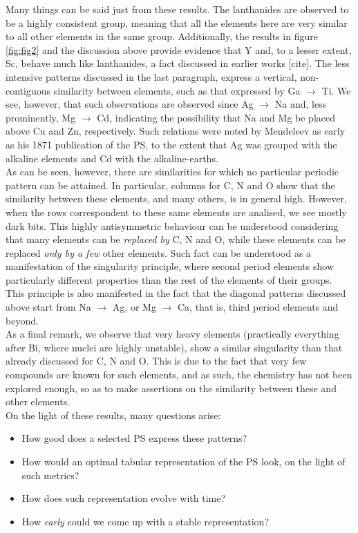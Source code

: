 \documentclass[article]{article}
\begin{document}
Many things can be said just from these results. The lanthanides are observed to be a highly consistent group, meaning that all the elements here are very similar to all other elements in the same group. Additionally, the results in figure \ref{fig:fig2} and the discussion above provide evidence that Y and, to a lesser extent, Sc, behave much like lanthanides, a fact discussed in earlier works [cite]. The less intensive patterns discussed in the last paragraph, express a vertical, non-contiguous similarity between elements, such as that expressed by Ga $\rightarrow$ Ti. We see, however, that such observations are observed since Ag $\rightarrow$ Na and, less prominently, Mg $\rightarrow$ Cd, indicating the possibility that Na and Mg be placed above Cu and Zn, respectively. Such relations were noted by Mendeleev as early as his 1871 publication of the PS, to the extent that Ag was grouped with the alkaline elements and Cd with the alkaline-earths.\\

As can be seen, however, there are similarities for which no particular periodic pattern can be attained. In particular, columns for C, N and O show that the similarity between these elements, and many others, is in general high. However, when the rows correspondent to these same elements are analised, we see mostly dark bits. This highly antisymmetric behaviour can be understood considering that many elements can be \textit{replaced by} C, N and O, while these elements can be replaced \textit{only by a few} other elements. Such fact can be understood as a manifestation of the singularity principle, where second period elements show particularly different properties than the rest of the elements of their groups. This principle is also manifested in the fact that the diagonal patterns discussed above start from Na $\rightarrow$ Ag, or Mg  $\rightarrow$ Ca, that is, third period elements and beyond.\\

As a final remark, we observe that very heavy elements (practically everything after Bi, where nuclei are highly unstable), show a similar singularity than that already discussed for C, N and O. This is due to the fact that very few compounds are known for such elements, and as such, the chemistry has not been explored enough, so as to make assertions on the similarity between these and other elements.\\

On the light of these results, many questions arise:
\begin{itemize}
	\item How good does a selected PS express these patterns? 
	\item How would an optimal tabular representation of the PS look, on the light of such metrics?
	\item How does such representation evolve with time?
	\item How \textit{early} could we come up with a stable representation?
\end{itemize}
\end{document}
